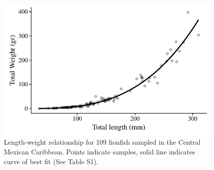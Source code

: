 \documentclass[fleqn,10pt,lineno]{wlpeerj} %
\begin{document}
\begin{figure}
\centering
\includegraphics{Manuscript_files/figure-latex/unnamed-chunk-3-1.pdf}
\caption{\label{fig:unnamed-chunk-3}\label{fig:l-w-carib}Length-weight
relationship for 109 lionfish sampled in the Central Mexican Caribbean.
Points indicate samples, solid line indicates curve of best fit (See
Table S1).}
\end{figure}
\end{document}
